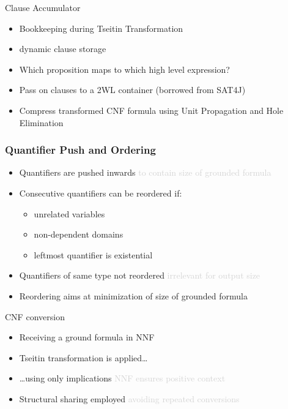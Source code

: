 \documentclass[smaller,dvipsnames,ratio=169]{beamer}
\begin{document}
  \begin{frame}{Clause Accumulator}
    \begin{itemize}
      \item \alert{Bookkeeping} during Tseitin Transformation
      \item dynamic clause storage
      \item Which proposition maps to which high level expression?
      \item Pass on clauses to a 2WL container (borrowed from SAT4J)
      \item \alert{Compress} transformed CNF formula using Unit Propagation and Hole Elimination
    \end{itemize}
  \end{frame}
  
  \begin{frame}
    \frametitle{Quantifier Push and Ordering}
    \begin{itemize}
      \item Quantifiers are pushed \alert{inwards} \textcolor{lightgray}{to contain size of grounded formula}
      \item Consecutive quantifiers can be reordered if:
      \begin{itemize}
        \item unrelated variables
        \item \alert{non-dependent} domains 
        \item leftmost quantifier is existential
      \end{itemize}
      \item Quantifiers of same type not reordered \textcolor{lightgray}{irrelevant for output size}
      \item Reordering aims at \alert{minimization} of size of grounded formula
    \end{itemize}
  \end{frame}

  \begin{frame}{CNF conversion}
    \begin{itemize}
      \item Receiving a ground formula in NNF 
      \item \alert{Tseitin transformation} is applied\ldots
      \item \ldots{}using only \alert{implications} \textcolor{lightgray}{NNF ensures positive context}
      \item Structural \alert{sharing} employed \textcolor{lightgray}{avoiding repeated conversions} %
    \end{itemize}
  \end{frame}
\end{document}
